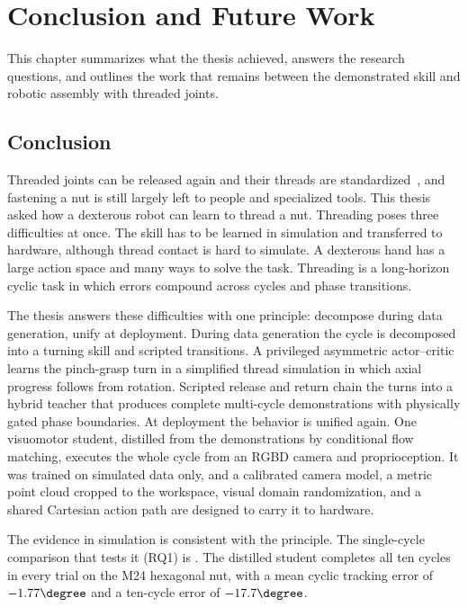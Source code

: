 \chapter{Conclusion and Future Work}\label{ch:conclusion}%

This chapter summarizes what the thesis achieved, answers the research questions, and outlines the work that remains between the demonstrated skill and robotic assembly with threaded joints.

\section{Conclusion}\label{sec:conclusion}

Threaded joints can be released again and their threads are standardized~\cite{Budynas2020}, and fastening a nut is still largely left to people and specialized tools. This thesis asked how a dexterous robot can learn to thread a nut. Threading poses three difficulties at once. The skill has to be learned in simulation and transferred to hardware, although thread contact is hard to simulate. A dexterous hand has a large action space and many ways to solve the task. Threading is a long-horizon cyclic task in which errors compound across cycles and phase transitions.

The thesis answers these difficulties with one principle: decompose during data generation, unify at deployment. During data generation the cycle is decomposed into a turning skill and scripted transitions. A privileged asymmetric actor--critic learns the pinch-grasp turn in a simplified thread simulation in which axial progress follows from rotation. Scripted release and return chain the turns into a hybrid teacher that produces complete multi-cycle demonstrations with physically gated phase boundaries. At deployment the behavior is unified again. One visuomotor student, distilled from the demonstrations by conditional flow matching, executes the whole cycle from an \acs{RGBD} camera and proprioception. It was trained on simulated data only, and a calibrated camera model, a metric point cloud cropped to the workspace, visual domain randomization, and a shared Cartesian action path are designed to carry it to hardware.

The evidence in simulation is consistent with the principle. The single-cycle comparison that tests it (RQ1) is \tbd. The distilled student completes all ten cycles in every trial on the M24 hexagonal nut, with a mean cyclic tracking error of $-1.77\degree$ and a ten-cycle error of $-17.7\degree$.

